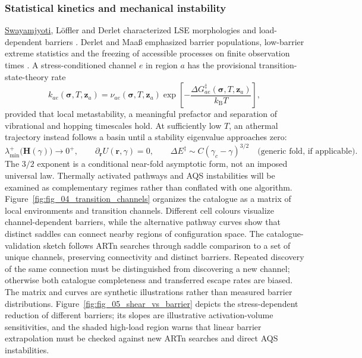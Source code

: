 \documentclass[11pt,a4paper]{article}
\begin{document}
\subsubsection{Statistical kinetics and mechanical instability}
\underline{Swayamjyoti}, L\"offler and Derlet characterized LSE morphologies and load-dependent barriers \cite{sway2014,sway2016}. Derlet and Maa\ss{} emphasized barrier populations, low-barrier extreme statistics and the freezing of accessible processes on finite observation times \cite{derlet2011,derlet2013,derlet2014}. A stress-conditioned channel $e$ in region $a$ has the provisional transition-state-theory rate
\begin{equation}
 k_{ae}(\bm\sigma,T,\mathbf z_a)=\nu_{ae}(\bm\sigma,T,\mathbf z_a)
 \exp\!\left[-\frac{\Delta G^\ddagger_{ae}(\bm\sigma,T,\mathbf z_a)}{k_{\mathrm B}T}\right],\label{eq:rate}
\end{equation}
provided that local metastability, a meaningful prefactor and separation of vibrational and hopping timescales hold. At sufficiently low $T$, an athermal trajectory instead follows a basin until a stability eigenvalue approaches zero:
\begin{equation}
 \lambda_{\min}^{+}\!\big(\mathbf H(\gamma)\big)\to0^+,\qquad
 \partial_{\mathbf r}U(\mathbf r,\gamma)=0,\qquad
 \Delta E^\ddagger\sim C(\gamma_c-\gamma)^{3/2}\quad\text{(generic fold, if applicable)}.\label{eq:fold}
\end{equation}
The $3/2$ exponent is a conditional near-fold asymptotic form, not an imposed universal law. Thermally activated pathways and AQS instabilities will be examined as complementary regimes rather than conflated with one algorithm. Figure~\ref{fig:fig_04_transition_channels} organizes the catalogue as a matrix of local environments and transition channels. Different cell colours visualize channel-dependent barriers, while the alternative pathway curves show that distinct saddles can connect nearby regions of configuration space. The catalogue-validation sketch follows ARTn searches through saddle comparison to a set of unique channels, preserving connectivity and distinct barriers. Repeated discovery of the same connection must be distinguished from discovering a new channel; otherwise both catalogue completeness and transferred escape rates are biased. The matrix and curves are synthetic illustrations rather than measured barrier distributions. Figure~\ref{fig:fig_05_shear_vs_barrier} depicts the stress-dependent reduction of different barriers; its slopes are illustrative activation-volume sensitivities, and the shaded high-load region warns that linear barrier extrapolation must be checked against new ARTn searches and direct AQS instabilities.
\end{document}
